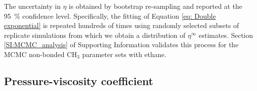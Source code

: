 \documentclass[preprint,review,12pt]{elsarticle}
\begin{document}
	 
	The uncertainty in $\eta$ is obtained by bootstrap re-sampling and reported at the 95~\% confidence level. Specifically, the fitting of Equation \ref{eq: Double exponential} is repeated hundreds of times using randomly selected subsets of replicate simulations from which we obtain a distribution of $\eta^{\infty}$ estimates. Section \ref{SI:MCMC_analysis} of Supporting Information validates this process for the MCMC non-bonded CH$_3$ parameter sets with ethane. 
		
%	
	
	
	\subsection{Pressure-viscosity coefficient} \label{Pressure-viscosity coefficient}
	
\end{document}
